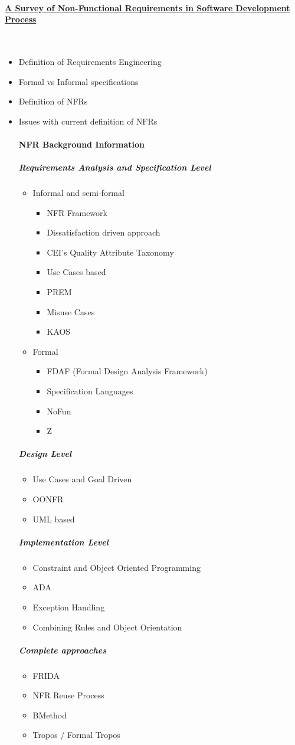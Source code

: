 \documentclass[dissertation]{softeng}
\begin{document}
\paragraph*{\underline{A Survey of Non-Functional Requirements in Software Development Process}}~\cite{Matoussi:2008wr}
\begin{itemize}
\item Definition of Requirements Engineering
\item Formal vs Informal specifications
\item Definition of NFRs
\item Issues with current definition of NFRs

\paragraph{NFR Background Information}
\subparagraph{Requirements Analysis and Specification Level}
\begin{itemize}
\item Informal and semi-formal
\begin{itemize}
\item NFR Framework
\item Dissatisfaction driven approach
\item CEI's Quality Attribute Taxonomy
\item Use Cases based
\item PREM
\item Misuse Cases
\item KAOS
\end{itemize}
\item Formal
\begin{itemize}
\item FDAF (Formal Design Analysis Framework)
\item Specification Languages 
\item NoFun
\item Z
\end{itemize}
\end{itemize}
\subparagraph{Design Level}
\begin{itemize}
\item Use Cases and Goal Driven 
\item OONFR
\item UML based
\end{itemize}
\subparagraph{Implementation Level}
\begin{itemize}
\item Constraint and Object Oriented Programming
\item ADA
\item Exception Handling
\item Combining Rules and Object Orientation
\end{itemize}
\subparagraph{Complete approaches}
\begin{itemize}
\item FRIDA
\item NFR Reuse Process
\item BMethod
\item Tropos / Formal Tropos
\end{itemize}
\end{itemize}
\pagebreak
\end{document}
